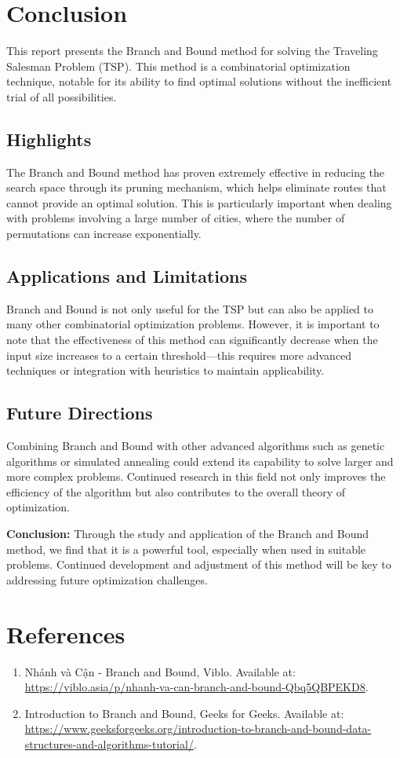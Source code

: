 \documentclass[a4paper]{article}
\begin{document}
\section{Conclusion}

This report presents the Branch and Bound method for solving the Traveling Salesman Problem (TSP). This method is a combinatorial optimization technique, notable for its ability to find optimal solutions without the inefficient trial of all possibilities.

\subsection{Highlights}
The Branch and Bound method has proven extremely effective in reducing the search space through its pruning mechanism, which helps eliminate routes that cannot provide an optimal solution. This is particularly important when dealing with problems involving a large number of cities, where the number of permutations can increase exponentially.

\subsection{Applications and Limitations}
Branch and Bound is not only useful for the TSP but can also be applied to many other combinatorial optimization problems. However, it is important to note that the effectiveness of this method can significantly decrease when the input size increases to a certain threshold—this requires more advanced techniques or integration with heuristics to maintain applicability.

\subsection{Future Directions}
Combining Branch and Bound with other advanced algorithms such as genetic algorithms or simulated annealing could extend its capability to solve larger and more complex problems. Continued research in this field not only improves the efficiency of the algorithm but also contributes to the overall theory of optimization.

\textbf{Conclusion:}
Through the study and application of the Branch and Bound method, we find that it is a powerful tool, especially when used in suitable problems. Continued development and adjustment of this method will be key to addressing future optimization challenges.

\newpage
\section*{References}
\begin{enumerate}
    \item Nhánh và Cận - Branch and Bound, Viblo. Available at: \url{https://viblo.asia/p/nhanh-va-can-branch-and-bound-Qbq5QBPEKD8}.
    \item Introduction to Branch and Bound, Geeks for Geeks. Available at: \url{https://www.geeksforgeeks.org/introduction-to-branch-and-bound-data-structures-and-algorithms-tutorial/}.
\end{enumerate}
\end{document}
